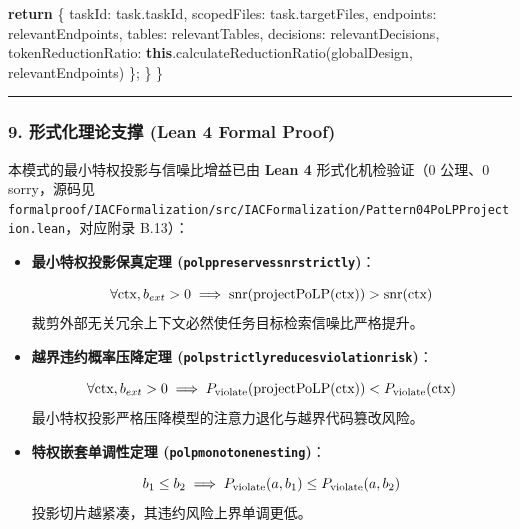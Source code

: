 \documentclass[
]{ctexart}
\newenvironment{Shaded}{}{}
\newcommand{\AttributeTok}[1]{\textcolor[rgb]{0.49,0.56,0.16}{#1}}
\newcommand{\ControlFlowTok}[1]{\textcolor[rgb]{0.00,0.44,0.13}{\textbf{#1}}}
\newcommand{\FunctionTok}[1]{\textcolor[rgb]{0.02,0.16,0.49}{#1}}
\newcommand{\KeywordTok}[1]{\textcolor[rgb]{0.00,0.44,0.13}{\textbf{#1}}}
\newcommand{\NormalTok}[1]{#1}
\newcommand{\OperatorTok}[1]{\textcolor[rgb]{0.40,0.40,0.40}{#1}}
\providecommand{\tightlist}{%
  \setlength{\itemsep}{0pt}\setlength{\parskip}{0pt}}
\renewcommand{\_}{\discretionary{}{}{\textunderscore}}
\renewcommand{\text}[1]{\textnormal{#1}}
\begin{document}
\begin{Shaded}
\begin{Highlighting}[]
    \ControlFlowTok{return}\NormalTok{ \{}
\NormalTok{      taskId}\OperatorTok{:}\NormalTok{ task}\OperatorTok{.}\AttributeTok{taskId}\OperatorTok{,}
\NormalTok{      scopedFiles}\OperatorTok{:}\NormalTok{ task}\OperatorTok{.}\AttributeTok{targetFiles}\OperatorTok{,}
\NormalTok{      endpoints}\OperatorTok{:}\NormalTok{ relevantEndpoints}\OperatorTok{,}
\NormalTok{      tables}\OperatorTok{:}\NormalTok{ relevantTables}\OperatorTok{,}
\NormalTok{      decisions}\OperatorTok{:}\NormalTok{ relevantDecisions}\OperatorTok{,}
\NormalTok{      tokenReductionRatio}\OperatorTok{:} \KeywordTok{this}\OperatorTok{.}\FunctionTok{calculateReductionRatio}\NormalTok{(globalDesign}\OperatorTok{,}\NormalTok{ relevantEndpoints)}
\NormalTok{    \}}\OperatorTok{;}
\NormalTok{  \}}
\NormalTok{\}}
\end{Highlighting}
\end{Shaded}

\begin{center}\rule{0.5\linewidth}{0.5pt}\end{center}

\subsubsection{9. 形式化理论支撑 (Lean 4
Formal Proof)}\label{ux5f62ux5f0fux5316ux7406ux8bbaux652fux6491-lean-4-formal-proof}

本模式的最小特权投影与信噪比增益已由 \textbf{Lean 4}
形式化机检验证（0 公理、0
sorry，源码见
\texttt{formal\_proof/IACFormalization/src/IACFormalization/Pattern04\_PoLPProjection.lean}，对应附录
B.13）：

\begin{itemize}
\tightlist
\item
  \textbf{最小特权投影保真定理
  (\texttt{polp\_preserves\_snr\_strictly})}：

  \[\forall \text{ctx}, b_{ext} > 0 \implies \operatorname{snr}(\operatorname{projectPoLP}(\text{ctx})) > \operatorname{snr}(\text{ctx})\]
  裁剪外部无关冗余上下文必然使任务目标检索信噪比严格提升。
\item
  \textbf{越界违约概率压降定理
  (\texttt{polp\_strictly\_reduces\_violation\_risk})}：

  \[\forall \text{ctx}, b_{ext} > 0 \implies P_{\text{violate}}(\operatorname{projectPoLP}(\text{ctx})) < P_{\text{violate}}(\text{ctx})\]
  最小特权投影严格压降模型的注意力退化与越界代码篡改风险。
\item
  \textbf{特权嵌套单调性定理
  (\texttt{polp\_monotone\_nesting})}：

  \[b_1 \le b_2 \implies P_{\text{violate}}(a, b_1) \le P_{\text{violate}}(a, b_2)\]
  投影切片越紧凑，其违约风险上界单调更低。
\end{itemize}
\end{document}
